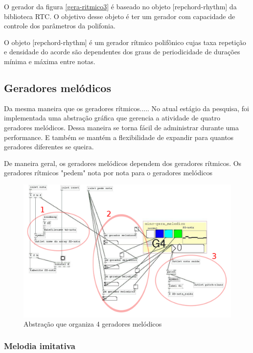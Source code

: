 \documentclass[draft]{ppgmus}
\begin{document}
O gerador da figura \ref{gera-ritmico3} é baseado no 
objeto [repchord-rhythm] da biblioteca RTC. O objetivo desse objeto é 
ter um gerador com capacidade de controle dos parâmetros da polifonia.

O objeto [repchord-rhythm] é um gerador rítmico polifônico cujas taxa repetição
e densidade do acorde são dependentes dos graus de periodicidade de durações
mínima e máxima entre notas. 


\subsection{Geradores melódicos}


Da mesma maneira que os geradores rítmicos.....
No atual estágio da pesquisa, foi implementada uma abstração gráfica
que gerencia a atividade de quatro geradores melódicos. Dessa
maneira se torna fácil de administrar durante uma performance.
E também se mantém a flexibilidade de expandir para quantos
geradores diferentes se queira.


De maneira geral, os geradores melódicos dependem dos geradores
rítmicos. Os geradores rítmicos "pedem" nota por nota para o geradores
melódicos


\begin{figure}
\includegraphics[scale=.45]{sinc-gera-melodico}
\caption{Abstração que organiza 4 geradores melódicos}
\label{[sinc-gera-melodico]}
\end{figure}


\subsubsection{Melodia imitativa}
\end{document}
